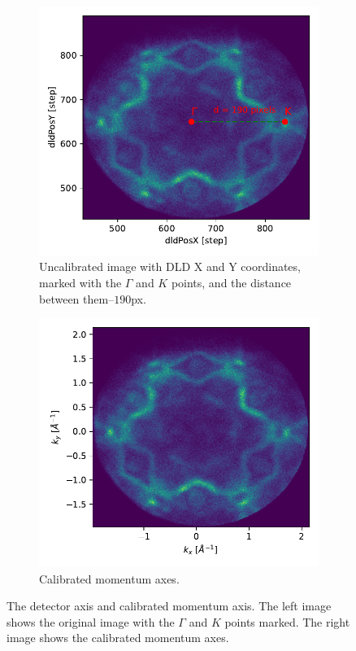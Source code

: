 \begin{figure}[ht]
    \centering
    \begin{subfigure}[t]{0.49\linewidth}
        \centering
        \includegraphics[width=\linewidth]{images/original_image_gamma_k.pdf}
        \caption{Uncalibrated image with \gls{DLD} X and Y coordinates, marked with the $\Gamma$ and $K$ points, and the distance between them--$190$px.}
        \label{fig:original-pixel-gamma-k}
    \end{subfigure}
    \hfill
    \begin{subfigure}[t]{0.49\linewidth}
        \centering
        \includegraphics[width=\linewidth]{images/calibrated_momentum.pdf}
        \caption{Calibrated momentum axes.}
        \label{fig:calibrated-momentum}
    \end{subfigure}
    \caption{The detector axis and calibrated momentum axis. The left image shows the original image with the $\Gamma$ and $K$ points marked. The right image shows the calibrated momentum axes.}
\end{figure}